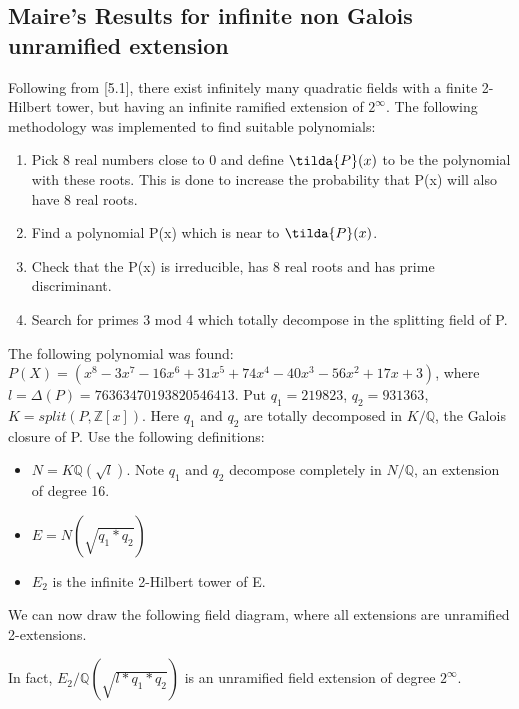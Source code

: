 \documentclass[preprint,12pt]{elsarticle}
\begin{document}
\subsection{Maire's Results for infinite non Galois unramified extension}
Following from \cite{MAIR}[5.1], there exist infinitely many quadratic fields with a finite 2-Hilbert tower, but having an infinite ramified extension of $2^{\infty{}}$. 
The following methodology was implemented  to find suitable polynomials:
\newline
\begin{enumerate}
    \item Pick 8 real numbers close to 0 and define $\tilda{P}(x)$ to be the polynomial with these roots. This is done to increase the probability that P(x) will also have 8 real roots. 
    \item Find a polynomial P(x) which is near to $\tilda{P}(x)$.
    \item Check that the P(x) is irreducible, has 8 real roots and has prime discriminant. 
    \item Search for primes 3 mod 4 which totally decompose in the splitting field of P. 
\end{enumerate}
The following polynomial was found: 
\newline
$P(X) = (x^8 - 3x^7 - 16x^6 + 31x^5 + 74x^4 - 40x^3 - 56x^2 + 17x + 3)$,
where 
\newline
$l = \Delta(P) = 76363470193820546413$. 
\newline
Put $q_1 = 219823$, $q_2 = 931363$, $K = split(P, \mathbb{Z}[x])$.
\newline
Here $q_1$ and  $q_2$ are totally decomposed in $K/\mathbb{Q}$, the Galois closure of P.
\newline
Use the following definitions: 
\begin{itemize}
    \item $N = K\mathbb{Q}(\sqrt{l})$. Note $q_1$ and $q_2$ decompose completely in $N/\mathbb{Q}$, an extension of degree 16.
    \item $E = N(\sqrt{q_1*q_2})$
    \item $E_2$ is the infinite 2-Hilbert tower of E.
\end{itemize}
\newline 
We can now draw the following field diagram, where all extensions are unramified 2-extensions. 

\begin{center}
\end{center}
\newline
In fact, $E_2/\mathbb{Q}(\sqrt{l*q_1*q_2})$ is an unramified field extension of degree $2^{\infty}$.
\end{document}
